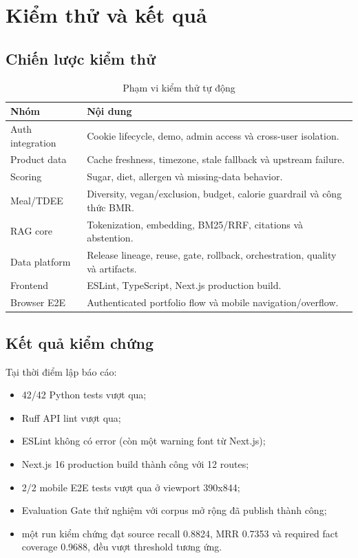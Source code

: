 \documentclass[12pt,a4paper]{report}
\begin{document}
\chapter{Kiểm thử và kết quả}

\section{Chiến lược kiểm thử}

\begin{table}[H]
\centering
\begin{tabularx}{\textwidth}{lX}
\toprule
\textbf{Nhóm} & \textbf{Nội dung}\\
\midrule
Auth integration & Cookie lifecycle, demo, admin access và cross-user isolation.\\
Product data & Cache freshness, timezone, stale fallback và upstream failure.\\
Scoring & Sugar, diet, allergen và missing-data behavior.\\
Meal/TDEE & Diversity, vegan/exclusion, budget, calorie guardrail và công thức BMR.\\
RAG core & Tokenization, embedding, BM25/RRF, citations và abstention.\\
Data platform & Release lineage, reuse, gate, rollback, orchestration, quality và artifacts.\\
Frontend & ESLint, TypeScript, Next.js production build.\\
Browser E2E & Authenticated portfolio flow và mobile navigation/overflow.\\
\bottomrule
\end{tabularx}
\caption{Phạm vi kiểm thử tự động}
\end{table}

\section{Kết quả kiểm chứng}

Tại thời điểm lập báo cáo:

\begin{itemize}
  \item 42/42 Python tests vượt qua;
  \item Ruff API lint vượt qua;
  \item ESLint không có error (còn một warning font từ Next.js);
  \item Next.js 16 production build thành công với 12 routes;
  \item 2/2 mobile E2E tests vượt qua ở viewport 390x844;
  \item Evaluation Gate thử nghiệm với corpus mở rộng đã publish thành công;
  \item một run kiểm chứng đạt source recall 0.8824, MRR 0.7353 và required
  fact coverage 0.9688, đều vượt threshold tương ứng.
\end{itemize}
\end{document}
